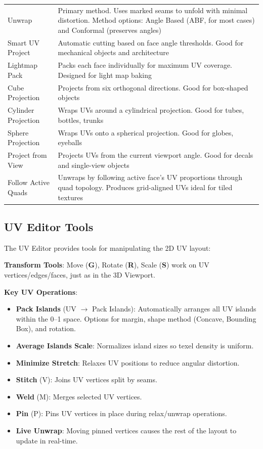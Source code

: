 \begin{center}
\begin{tabularx}{\textwidth}{L{3.5cm}X}
\toprule
{}
 &  \\
\midrule
Unwrap & Primary method. Uses marked seams to unfold with minimal distortion. Method options: Angle Based (ABF, for most cases) and Conformal (preserves angles) \\
Smart UV Project & Automatic cutting based on face angle thresholds. Good for mechanical objects and architecture \\
Lightmap Pack & Packs each face individually for maximum UV coverage. Designed for light map baking \\
Cube Projection & Projects from six orthogonal directions. Good for box-shaped objects \\
Cylinder Projection & Wraps UVs around a cylindrical projection. Good for tubes, bottles, trunks \\
Sphere Projection & Wraps UVs onto a spherical projection. Good for globes, eyeballs \\
Project from View & Projects UVs from the current viewport angle. Good for decals and single-view objects \\
Follow Active Quads & Unwraps by following active face's UV proportions through quad topology. Produces grid-aligned UVs ideal for tiled textures \\
\bottomrule
\end{tabularx}
\end{center}

\subsection{UV Editor Tools}
\label{sec:uveditor}

The UV Editor provides tools for manipulating the 2D UV layout:

\textbf{Transform Tools}: Move (\textbf{G}), Rotate (\textbf{R}), Scale (\textbf{S}) work on UV vertices/edges/faces, just as in the 3D Viewport.

\textbf{Key UV Operations}:
\begin{itemize}[leftmargin=2em]
  \item \textbf{Pack Islands} (UV $\rightarrow$ Pack Islands): Automatically arranges all UV islands within the 0--1 space. Options for margin, shape method (Concave, Bounding Box), and rotation.
  \item \textbf{Average Islands Scale}: Normalizes island sizes so texel density is uniform.
  \item \textbf{Minimize Stretch}: Relaxes UV positions to reduce angular distortion.
  \item \textbf{Stitch} (V): Joins UV vertices split by seams.
  \item \textbf{Weld} (M): Merges selected UV vertices.
  \item \textbf{Pin} (P): Pins UV vertices in place during relax/unwrap operations.
  \item \textbf{Live Unwrap}: Moving pinned vertices causes the rest of the layout to update in real-time.
\end{itemize}

